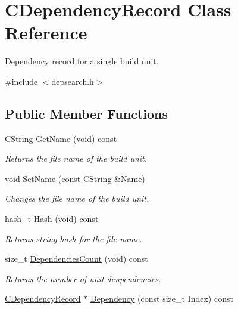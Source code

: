 \hypertarget{classCDependencyRecord}{\section{C\-Dependency\-Record Class Reference}
\label{classCDependencyRecord}
}


Dependency record for a single build unit.  




{\ttfamily \#include $<$depsearch.\-h$>$}

\subsection*{Public Member Functions}
\begin{DoxyCompactItemize}
\item 
\hyperlink{classCString}{C\-String} \hyperlink{classCDependencyRecord_a2d3b62dc0a1a7625f8ac3ae2a07422e8}{Get\-Name} (void) const 
\begin{DoxyCompactList}\small\item\em Returns the file name of the build unit. \end{DoxyCompactList}\item 
void \hyperlink{classCDependencyRecord_ac2b4b51ad9a0e119076162c70106bf8b}{Set\-Name} (const \hyperlink{classCString}{C\-String} \&Name)
\begin{DoxyCompactList}\small\item\em Changes the file name of the build unit. \end{DoxyCompactList}\item 
\hyperlink{stringhash_8h_a488906826f8aaf7e850c35889d560089}{hash\-\_\-t} \hyperlink{classCDependencyRecord_a256d718b856decdeed2ef53593601a3e}{Hash} (void) const 
\begin{DoxyCompactList}\small\item\em Returns string hash for the file name. \end{DoxyCompactList}\item 
size\-\_\-t \hyperlink{classCDependencyRecord_a4db9b6cc951a300ad044b22c7b52b1fa}{Dependencies\-Count} (void) const 
\begin{DoxyCompactList}\small\item\em Returns the number of unit denpendencies. \end{DoxyCompactList}\item 
\hyperlink{classCDependencyRecord}{C\-Dependency\-Record} $\ast$ \hyperlink{classCDependencyRecord_aafa03b2b0ca9fe418218ba089bdbb915}{Dependency} (const size\-\_\-t Index) const 

\end{DoxyCompactItemize}
